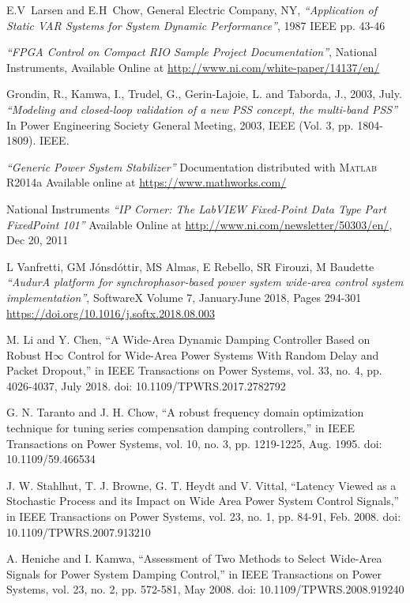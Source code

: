 \documentclass{ieeeaccess}
\begin{document}
\begin{thebibliography}{00}
 E.V~Larsen and E.H~Chow, General Electric Company, NY, \emph{``Application of Static VAR Systems for System Dynamic Performance''}, 1987 IEEE pp. 43-46

 \emph{``FPGA Control on Compact RIO Sample Project Documentation''}, National Instruments, Available Online at \underline{http://www.ni.com/white-paper/14137/en/}


 Grondin, R., Kamwa, I., Trudel, G., Gerin-Lajoie, L. and Taborda, J., 2003, July. \emph{``Modeling and closed-loop validation of a new PSS concept, the multi-band PSS''} In Power Engineering Society General Meeting, 2003, IEEE (Vol. 3, pp. 1804-1809). IEEE.

 \emph{``Generic Power System Stabilizer''} Documentation distributed with \textsc{Matlab} R2014a Available online at \underline{https://www.mathworks.com/}

National Instruments \emph{``IP Corner: The LabVIEW Fixed-Point Data Type Part Fixed\textendash Point 101''} Available Online at \underline{http://www.ni.com/newsletter/50303/en/}, Dec 20, 2011 

 L Vanfretti, GM J\'{o}nsd\'{o}ttir, MS Almas, E Rebello, SR Firouzi, M Baudette \emph{``Audur\textendash A platform for synchrophasor-based power system wide-area control system implementation''}, SoftwareX Volume 7, January\textendash June 2018, Pages 294-301 \underline{https://doi.org/10.1016/j.softx.2018.08.003}

 M. Li and Y. Chen, ``A Wide-Area Dynamic Damping Controller Based on Robust H$\infty$ Control for Wide-Area Power Systems With Random Delay and Packet Dropout,'' in IEEE Transactions on Power Systems, vol. 33, no. 4, pp. 4026-4037, July 2018. doi: 10.1109/TPWRS.2017.2782792

 G. N. Taranto and J. H. Chow, ``A robust frequency domain optimization technique for tuning series compensation damping controllers,'' in IEEE Transactions on Power Systems, vol. 10, no. 3, pp. 1219-1225, Aug. 1995.
doi: 10.1109/59.466534

 J. W. Stahlhut, T. J. Browne, G. T. Heydt and V. Vittal, ``Latency Viewed as a Stochastic Process and its Impact on Wide Area Power System Control Signals,''  in IEEE Transactions on Power Systems, vol. 23, no. 1, pp. 84-91, Feb. 2008. doi: 10.1109/TPWRS.2007.913210

 A. Heniche and I. Kamwa, ``Assessment of Two Methods to Select Wide-Area Signals for Power System Damping Control,'' in IEEE Transactions on Power Systems, vol. 23, no. 2, pp. 572-581, May 2008. doi: 10.1109/TPWRS.2008.919240


\end{thebibliography}
\end{document}
